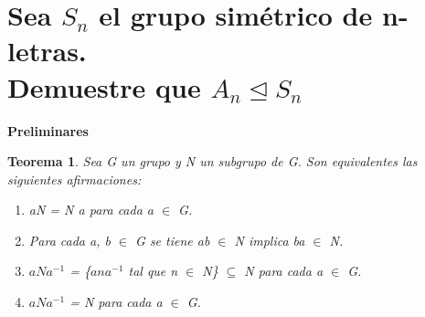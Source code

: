 \documentclass{article}
\newcounter{Teorema}
\numberwithin{equation}{section}
\theoremstyle{plain}  %
\newtheorem{thm}{Teorema}[section]
\begin{document}
\section{Sea $S_{n}$ el grupo simétrico de n-letras. \\ Demuestre que $A_{n} \trianglelefteq S_{n}$}
\textbf{Preliminares}\\
\begin{thm}
    Sea G un grupo y N un subgrupo de G. Son equivalentes las siguientes afirmaciones:
    \begin{enumerate}
        \item aN = N a para cada a $\in$ G.
        \item  Para cada a, b $\in$ G se tiene ab $\in$ N implica ba $\in$ N.
        \item $aNa^{-1}$ = \{$ana^{-1} $ tal que n $\in$ N\} $\subseteq$ N para cada a $\in$ G.
        \item $aNa^{-1}$ = N para cada a $\in$ G.
    \end{enumerate} 
\end{thm}
\end{document}
